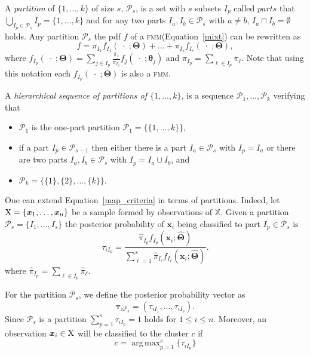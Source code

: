 \documentclass[submit]{smj}
\DeclareMathOperator*{\argmax}{arg\,max}
\theoremstyle{definition}
\newcommand{\m}[1]{\boldsymbol{#1}}
\newcommand{\fmm}{\textsc{fmm}\xspace}
\begin{document}
%
A \emph{partition} of $\{1, \dots, k\}$ of size $s$, $\mathcal{P}_s$,  is a set with $s$ subsets $I_p$ called $parts$ that $\bigcup_{I_p \in \mathcal{P}_s} I_p = \{1, \dots, k\}$ and for any two parts $I_a, I_b \in \mathcal{P}_s$ with $a \neq b$, $I_a \cap I_b = \emptyset$ holds. Any partition  $\mathcal{P}_s$ the pdf $f$ of a \fmm (Equation~\ref{mixt}) can be rewritten as
\begin{equation}
f = \pi_{I_1} f_{I_1}(\;\cdot\;; \m\Theta) + \dots + \pi_{I_s} f_{I_s}(\;\cdot\;; \m\Theta),
\label{mixt_part}
\end{equation}
where $f_{I_p}(\;\cdot\;;  \m\Theta) = \sum_{j \in I_p} \frac{\pi_j}{\pi_{I_p}} f_j(\;\cdot\; ; \m\theta_j)$ and $\pi_{I_p} = \sum_{\ell \in I_p} \pi_\ell$. Note that using this notation each $f_{I_p}(\;\cdot\;;  \m\Theta)$ is also a \fmm.



A \emph{hierarchical sequence of partitions of $\{1,...,k\}$}, is a sequence $\mathcal{P}_1, \dots, \mathcal{P}_k$ verifying that
\begin{itemize}
\item $\mathcal{P}_1$ is the one-part partition $\mathcal{P}_1 = \{ \{1, \dots, k\} \}$,
\item if a part $I_p \in \mathcal{P}_{s-1}$ then either there is a part $I_a \in \mathcal{P}_{s}$ with $I_p = I_a$ or there are two parts $I_a, I_b \in \mathcal{P}_s$ with $I_p = I_a \cup I_b$, and
\item $\mathcal{P}_k= \{ \{1\},\{2\}, \dots, \{k\} \}$.
\end{itemize}



One can extend Equation~\ref{map_criteria} in terms of partitions. Indeed, let $\rm X = \{\m x_1,\dots, \m x_n\}$ be a sample formed by observations of $\mathbb{X}$. Given a partition $\mathcal{P}_s = \{ I_1, \dots, I_s \}$ the posterior probability of $\m x_i$ being classified to part $I_p\in \mathcal{P}_{s}$ is
\[
\tau_{i I_p} =  \frac{ \hat{\pi}_{I_p} f_{I_p}(\m x_i; \hat{\m\Theta}) }{\sum_{\ell=1}^s \hat{\pi}_{I_\ell} f_{I_\ell}(\m x_i; \hat{\m\Theta})}.
\]
where $\hat{\pi}_{I_p} = \sum_{\ell \in I_p} \hat{\pi}_\ell$.

For the partition  $\mathcal{P}_s$, we define the posterior probability vector as
\begin{equation}\label{ppv}
\m\tau_{i \mathcal{P}_s} = \left(\tau_{i I_1} , \dots, \tau_{i I_s}  \right).
\end{equation}
Since $\mathcal{P}_s$ is a partition $\sum_{p=1}^s \tau_{i I_p} = 1$ holds  for $1 \leq i \leq n$.
Moreover, an observation $\m x_i \in \rm X$ will be classified to the cluster $c$ if
\begin{equation}\label{cluster_criteria}
c= \argmax_{p=1}^s \{ \tau_{i I_p} \}
\end{equation}
\end{document}
